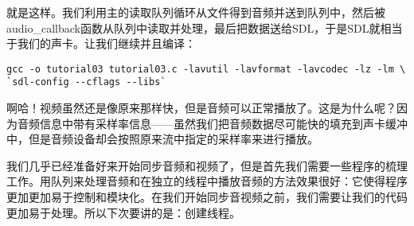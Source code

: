 就是这样。我们利用主的读取队列循环从文件得到音频并送到队列中，然后被audio_callback函数从队列中读取并处理，最后把数据送给SDL，于是SDL就相当于我们的声卡。让我们继续并且编译：

\begin{lstlisting}
gcc -o tutorial03 tutorial03.c -lavutil -lavformat -lavcodec -lz -lm \
`sdl-config --cflags --libs`
\end{lstlisting}

啊哈！视频虽然还是像原来那样快，但是音频可以正常播放了。这是为什么呢？因为音频信息中带有采样率信息——虽然我们把音频数据尽可能快的填充到声卡缓冲中，但是音频设备却会按照原来流中指定的采样率来进行播放。

我们几乎已经准备好来开始同步音频和视频了，但是首先我们需要一些程序的梳理工作。用队列来处理音频和在独立的线程中播放音频的方法效果很好：它使得程序更加更加易于控制和模块化。在我们开始同步音视频之前，我们需要让我们的代码更加易于处理。所以下次要讲的是：创建线程。
